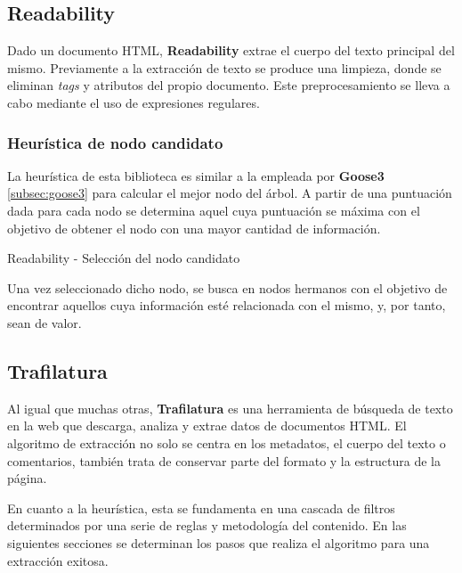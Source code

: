 \subsection{Readability}
\label{subsec:readability}

Dado un documento HTML, \textbf{Readability} \cite{readability} extrae el cuerpo del texto principal del 
mismo. Previamente a la extracción de texto se produce una limpieza, donde se eliminan \emph{tags} y 
atributos del propio documento. Este preprocesamiento se lleva a cabo mediante el uso de expresiones 
regulares.

\subsubsection{Heurística de nodo candidato}
\label{subsubsec:heuristica de nodo candidato}

La heurística de esta biblioteca es similar a la empleada por \textbf{Goose3} \ref{subsec:goose3} para
calcular el mejor nodo del árbol. A partir de una puntuación dada para cada nodo se determina aquel cuya
puntuación se máxima con el objetivo de obtener el nodo con una mayor cantidad de información.

\begin{codefloat}
  
  \caption{Readability - Selección del nodo candidato}
  \label{cod:readability - seleccion del nodo candidato}
\end{codefloat}

Una vez seleccionado dicho nodo, se busca en nodos hermanos con el objetivo de encontrar aquellos cuya
información esté relacionada con el mismo, y, por tanto, sean de valor.

\subsection{Trafilatura}
\label{subsec:trafilatura}

Al igual que muchas otras, \textbf{Trafilatura} \cite{trafilatura} es una herramienta de búsqueda de texto
en la web que descarga, analiza y extrae datos de documentos HTML. El algoritmo de extracción no solo se
centra en los metadatos, el cuerpo del texto o comentarios, también trata de conservar parte del formato
y la estructura de la página.

En cuanto a la heurística, esta se fundamenta en una cascada de filtros determinados por una serie de 
reglas y metodología del contenido. En las siguientes secciones se determinan los pasos que realiza el
algoritmo para una extracción exitosa.

